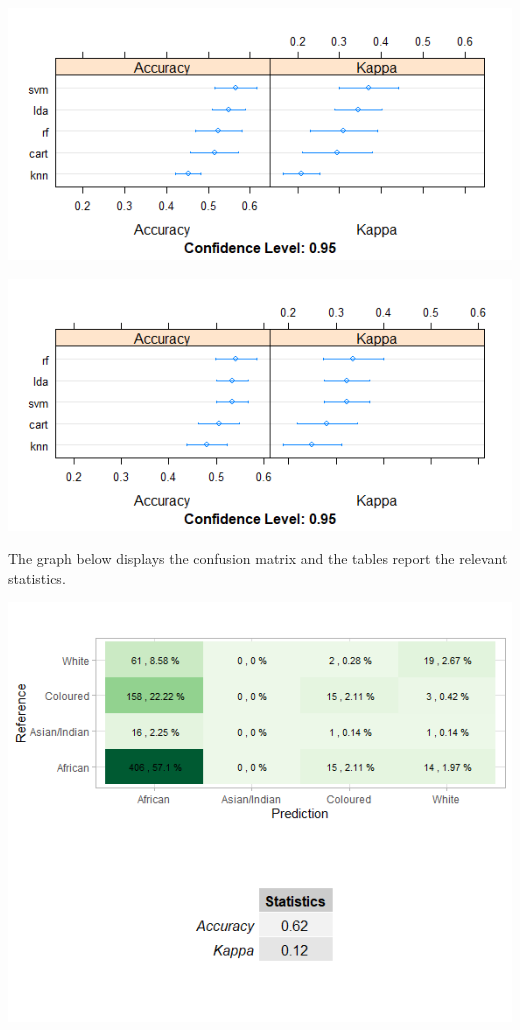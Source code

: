 \documentclass[11pt,preprint, authoryear]{elsarticle}
\let\origfigure\figure
\let\endorigfigure\endfigure
\renewenvironment{figure}[1][2] {
    \expandafter\origfigure\expandafter[H]
} {
    \endorigfigure
}
\numberwithin{equation}{section}
\numberwithin{figure}{section}
\numberwithin{table}{section}
\begin{document}
\begin{figure}
\centering
\includegraphics{"images/bal1.png"}
\caption{Machine Learning applied to balanced (undersampled) data}
\end{figure}

\begin{figure}
\centering
\includegraphics{"images/bal2.png"}
\caption{Machine Learning applied to balanced data}
\end{figure}

The graph below displays the confusion matrix and the tables report the
relevant statistics.

\begin{figure}
\centering
\includegraphics{"images/cmrf.png"}
\caption{Random Forest Confusion Matrix}
\end{figure}
\end{document}
